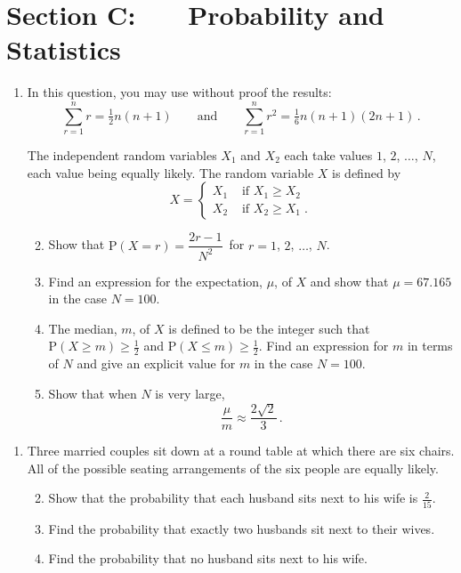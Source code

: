 \documentclass[a4, 11pt]{report}
\newlength{\qspace}
\newcounter{qnumber}
\newenvironment{question}%
 {\vspace{\qspace}
  \begin{enumerate}[\bfseries 1\quad][10]%
    \setcounter{enumi}{\value{qnumber}}%
    \item%
 }
{
  \end{enumerate}
  \filbreak
  \stepcounter{qnumber}
 }
\newenvironment{questionparts}[1][1]%
 {
  \begin{enumerate}[\bfseries (i)]%
    \setcounter{enumii}{#1}
    \addtocounter{enumii}{-1}
    \setlength{\itemsep}{5mm}
    \setlength{\parskip}{8pt}
 }
 {
  \end{enumerate}
 }
\def\P{{\mathrm P}}
\def\le{\leqslant}
\def\ge{\geqslant}
\begin{document}
	
	\newpage
\section*{Section C: \ \ \ Probability and Statistics}


\begin{question}
In this question, you may use without proof the results:
\[
 \sum_{r=1}^n r = \tfrac12 n(n+1)
\qquad\text{and}\qquad
 \sum_{r=1}^n r^2 = \tfrac1 6 n(n+1)(2n+1)\,.
\]


The independent random variables $X_1$ and $X_2$ each take values
$1$, $2$, $\ldots$, $N$, each value being equally likely. The random
variable
$X$ is defined by
\[
X= 
\begin{cases}
X_1 & \text { if } X_1\ge X_2\\
X_2 & \text { if } X_2\ge X_1\;.
\end{cases}
\]

\begin{questionparts}
\item Show that $\P(X=r) = \dfrac{2r-1}{N^2}\,$ for $r=1$, $2$, $\ldots$, $N$.



\item Find an expression for the expectation, $\mu$,  of $X$ and show
  that $\mu=67.165$ in the case $N=100$. 
 \item The  median, $m$, of $X$ is defined to be the integer such that
$\P(X\ge m) \ge \frac 12$ and $\P(X\le m)\ge \frac12$. Find an expression
for $m$ in terms of $N$
and give an explicit value for $m$
 in the case $N=100$.

\item Show that when $N$ is very large,
\[
\frac \mu m
 \approx \frac {2\sqrt2}3\,.
\]
\end{questionparts}
\end{question}

\begin{question}
Three married couples sit down at a round table at which
there are six chairs. All of the possible seating  arrangements
 of the six people
are equally likely.

\begin{questionparts}
\item
Show that the probability that each husband sits next to his wife
is $\frac{2}{15}$.
\item
Find the probability that exactly two husbands sit next to their
wives.
\item Find the probability that no husband sits next to his wife.
\end{questionparts}
\end{question}
\end{document}
